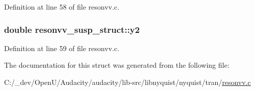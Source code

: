 Definition at line 58 of file resonvv.\+c.

\subsubsection[{\texorpdfstring{y2}{y2}}]{\setlength{\rightskip}{0pt plus 5cm}double resonvv\+\_\+susp\+\_\+struct\+::y2}\hypertarget{structresonvv__susp__struct_ad3c3b47b81614a8748ec59077528f5a2}{}\label{structresonvv__susp__struct_ad3c3b47b81614a8748ec59077528f5a2}


Definition at line 59 of file resonvv.\+c.



The documentation for this struct was generated from the following file\+:\begin{DoxyCompactItemize}
\item 
C\+:/\+\_\+dev/\+Open\+U/\+Audacity/audacity/lib-\/src/libnyquist/nyquist/tran/\hyperlink{resonvv_8c}{resonvv.\+c}\end{DoxyCompactItemize}
